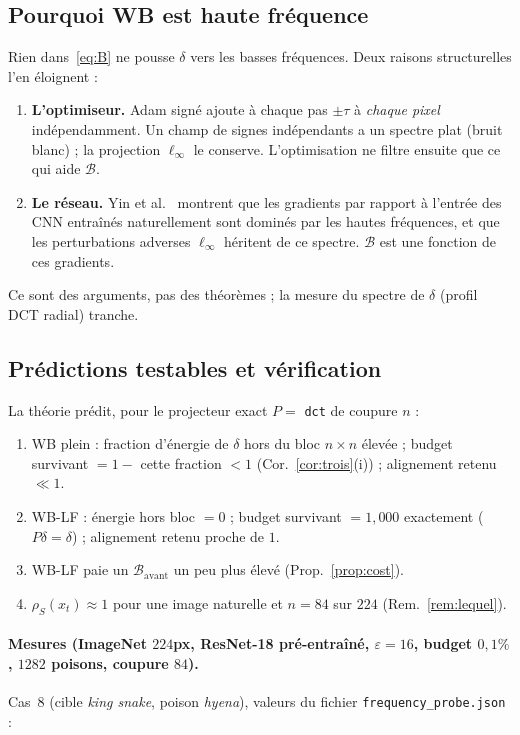 \documentclass[11pt,a4paper]{article}
\theoremstyle{plain}
\theoremstyle{definition}
\theoremstyle{remark}
\newcommand{\B}{\mathcal{B}}
\newcommand{\xt}{x_t}
\begin{document}
\subsection{Pourquoi WB est haute fréquence}

Rien dans~\eqref{eq:B} ne pousse $\delta$ vers les basses fréquences. Deux raisons structurelles
l'en éloignent :
\begin{enumerate}[label=(\alph*)]
\item \textbf{L'optimiseur.} Adam signé ajoute à chaque pas $\pm\tau$ à \emph{chaque pixel}
indépendamment. Un champ de signes indépendants a un spectre plat (bruit blanc) ; la projection
$\ell_\infty$ le conserve. L'optimisation ne filtre ensuite que ce qui aide $\B$.
\item \textbf{Le réseau.} Yin et al.~\cite{yin2019} montrent que les gradients par rapport à
l'entrée des CNN entraînés naturellement sont dominés par les hautes fréquences, et que les
perturbations adverses $\ell_\infty$ héritent de ce spectre. $\B$ est une fonction de ces
gradients.
\end{enumerate}
Ce sont des arguments, pas des théorèmes ; la mesure du spectre de $\delta$ (profil DCT radial)
tranche.

\subsection{Prédictions testables et vérification}

La théorie prédit, pour le projecteur exact $P=$ \texttt{dct} de coupure $n$ :
\begin{enumerate}[label=P\arabic*.]
\item WB plein : fraction d'énergie de $\delta$ hors du bloc $n\times n$ élevée ; budget survivant
$=1-$ cette fraction $<1$ (Cor.~\ref{cor:trois}(i)) ; alignement retenu $\ll1$.
\item WB-LF : énergie hors bloc $=0$ ; budget survivant $=1{,}000$ exactement
($P\delta=\delta$) ; alignement retenu proche de $1$.
\item WB-LF paie un $\B_{\text{avant}}$ un peu plus élevé (Prop.~\ref{prop:cost}).
\item $\rho_S(\xt)\approx1$ pour une image naturelle et $n=84$ sur $224$ (Rem.~\ref{rem:lequel}).
\end{enumerate}

\paragraph{Mesures (ImageNet $224$px, ResNet-18 pré-entraîné, $\varepsilon=16$, budget $0{,}1\%$, $1282$ poisons, coupure $84$).}
Cas~8 (cible \emph{king snake}, poison \emph{hyena}), valeurs du fichier \texttt{frequency\_probe.json} :
\end{document}
